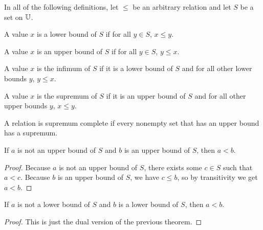 \documentclass[../math.tex]{subfiles}
\begin{document}
In all of the following definitions, let $\leq$ be an arbitrary relation and let
$S$ be a set on $\mathbb{U}$.

\begin{definition}
    A value $x$ is a lower bound of $S$ if for all $y \in S$, $x \leq y$.
\end{definition}

\begin{definition}
    A value $x$ is an upper bound of $S$ if for all $y \in S$, $y \leq x$.
\end{definition}

\begin{definition}
    A value $x$ is the infimum of $S$ if it is a lower bound of $S$ and for all
    other lower bounds $y$, $y \leq x$.
\end{definition}

\begin{definition}
    A value $x$ is the supremum of $S$ if it is an upper bound of $S$ and for
    all other upper bounds $y$, $x \leq y$.
\end{definition}

\begin{class}
    A relation is supremum complete if every nonempty set that has an upper
    bound has a supremum.
\end{class}

\begin{theorem} \label{upper_bound_leq}
    If $a$ is not an upper bound of $S$ and $b$ is an upper bound of $S$, then
    $a < b$.
\end{theorem}
\begin{proof}
    Because $a$ is not an upper bound of $S$, there exists some $c \in S$ such
    that $a < c$.  Because $b$ is an upper bound of $S$, we have $c \leq b$, so
    by transitivity we get $a < b$.
\end{proof}

\begin{theorem} \label{lower_bound_leq}
    If $a$ is not a lower bound of $S$ and $b$ is a lower bound of $S$, then $a
    < b$.
\end{theorem}
\begin{proof}
    This is just the dual version of the previous theorem.
\end{proof}
\end{document}

